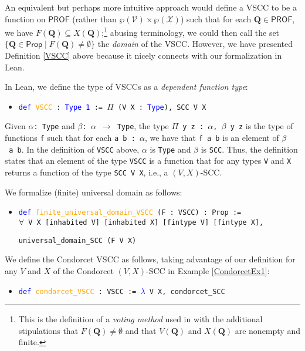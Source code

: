 \documentclass[runningheads]{llncs}
\begin{document}
\noindent An equivalent but perhaps more intuitive approach would define a VSCC to be a function on $\mathsf{PROF}$ (rather than $\wp(\mathcal{V})\times\wp(\mathcal{X})$) such that for each $\mathbf{Q}\in\mathsf{PROF}$, we have $F(\mathbf{Q})\subseteq X(\mathbf{Q})$;\footnote{This is the definition of a \textit{voting method} used in \cite{HP2020b} with the additional stipulations that $F(\mathbf{Q})\neq\emptyset$ and  that $V(\mathbf{Q})$ and $X(\mathbf{Q})$ are nonempty and finite.} abusing terminology, we could then call the set $\{\mathbf{Q}\in\mathsf{Prop}\mid F(\mathbf{Q})\neq\emptyset\}$ the \emph{domain} of the VSCC. However, we have presented Definition \ref{VSCC} above because it nicely connects with our formalization in Lean.



In Lean, we define the type of VSCCs as a \textit{dependent function type}:
\begin{itemize}
\item[] \texttt{\textcolor{blue}{def} \textcolor{orange}{VSCC} : \textcolor{blue}{Type 1} := $\Pi$ (V X : \textcolor{blue}{Type}), SCC V X}
\end{itemize}
Given \texttt{$\alpha$: Type} and \texttt{$\beta$: $\alpha$ $\to$ Type}, the type \texttt{$\Pi$ y z : $\alpha$, $\beta$ y z} is the type of functions \texttt{f} such that for each \texttt{a b : $\alpha$}, we have that \texttt{f a b} is an element of \texttt{$\beta$~a~b}. In the definition of \texttt{VSCC} above, $\alpha$ is \texttt{Type} and $\beta$ is \texttt{SCC}.  Thus, the definition states that an element of the type \texttt{VSCC} is a function that for any types \texttt{V} and \texttt{X} returns a function of the type \texttt{SCC V X}, i.e., a $(V,X)$-SCC. 

We formalize (finite) universal domain as follows:
\begin{itemize}
\item[] \texttt{\textcolor{blue}{def} \textcolor{orange}{finite\_universal\_domain\_VSCC} (F : VSCC) : Prop :=}\\
    \texttt{$\forall$ V X [inhabited V] [inhabited X] [fintype V] [fintype X],}
    
    \texttt{universal\_domain\_SCC (F V X)}
\end{itemize}

\begin{example} We define the Condorcet VSCC as follows, taking advantage of our definition for any $V$ and $X$ of the Condorcet $(V,X)$-SCC in Example \ref{CondorcetEx1}:
\begin{itemize}
\item[] \texttt{\textcolor{blue}{def} \textcolor{orange}{condorcet\_VSCC} : VSCC := \textcolor{blue}{$\lambda$} V X, condorcet\_SCC}
\end{itemize}
\end{example}
\end{document}
